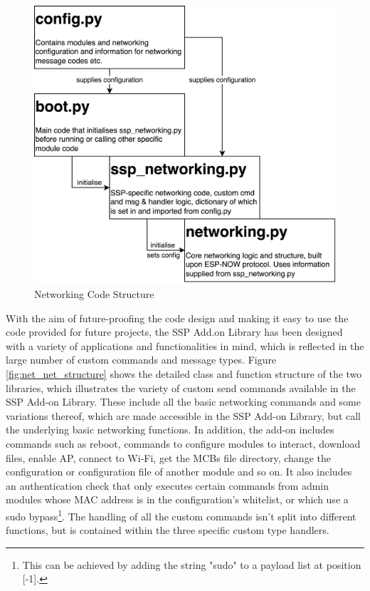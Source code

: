 \begin{figure}[H]
    \centering
    \includegraphics[width=.6\linewidth]{overleaf/images/code_structure.png}
    \vspace{\ftspace}
    \caption{Networking Code Structure}
    \label{fig:net_code_structure}
\end{figure}

With the aim of future-proofing the code design and making it easy to use the code provided for future projects, the SSP Add.on Library has been designed with a variety of applications and functionalities in mind, which is reflected in the large number of custom commands and message types. Figure \ref{fig:net_net_structure} shows the detailed class and function structure of the two libraries, which illustrates the variety of custom send commands available in the SSP Add-on Library. These include all the basic networking commands and some variations thereof, which are made accessible in the SSP Add-on Library, but call the underlying basic networking functions. In addition, the add-on includes commands such as reboot, commands to configure modules to interact, download files, enable AP, connect to Wi-Fi, get the MCBs file directory, change the configuration or configuration file of another module and so on. It also includes an authentication check that only executes certain commands from admin modules whose MAC address is in the configuration's whitelist, or which use a sudo bypass\footnote{This can be achieved by adding the string "sudo" to a payload list at position [-1].}. The handling of all the custom commands isn't split into different functions, but is contained within the three specific custom type handlers.

